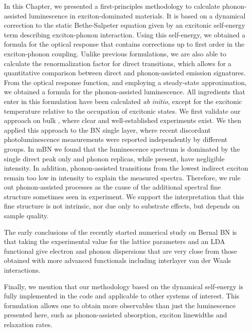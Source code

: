 In this Chapter, we presented a first-principles methodology to calculate phonon-assisted luminescence in exciton-dominated materials. It is based on a dynamical correction to the static Bethe-Salpeter equation given by an excitonic self-energy term describing exciton-phonon interaction. Using this self-energy, we obtained a formula for the optical response that contains corrections up to first order in the exciton-phonon coupling.
Unlike previous formulations, we are also able to calculate the renormalization factor for direct transitions, which allows for a quantitative comparison between direct and phonon-assisted emission signatures.
From the optical response function, and employing a steady-state approximation, we obtained a formula for the phonon-assisted luminescence. All ingredients that enter in this formulation have been calculated \emph{ab initio}, except for the excitonic temperature relative to the occupation of excitonic states.
We first validate our approach on bulk \hbn, where clear and well-established experiments exist. We then applied this approach to the BN single layer, where recent discordant photoluminescence measurements were reported independently by different groups. In mBN we found that the luminescence spectrum is dominated by the single direct peak only and phonon replicas, while present, have negligible intensity. In addition, 
phonon-assisted transitions from the lowest indirect exciton remain too low in intensity to explain the measured spectra. Therefore, we rule out phonon-assisted processes as the cause of the additional spectral fine structure sometimes seen in experiment.
We support the interpretation that this fine structure is not intrinsic, nor due only to substrate effects, but depends on sample quality.

The early conclusions of the recently started numerical study on Bernal BN is that taking the experimental value for the lattice parameters and an \acrshort{LDA} functional give electron and phonon dispersions that are very close from those obtained with more advanced functionals including interlayer van der Waals interactions. 

Finally, we mention that our methodology based on the dynamical self-energy is fully implemented in the \yambo code and applicable to other systems of interest. This formulation allows one to obtain more observables than just the luminescence presented here, such as phonon-assisted absorption, exciton linewidths and relaxation rates.
